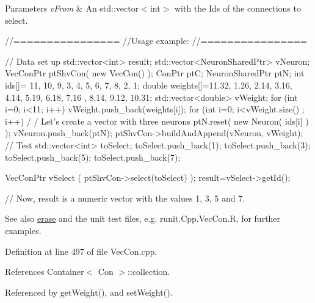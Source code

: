 \begin{DoxyParams}{Parameters}
{\em vFrom} & An std::vector$<$int$>$ with the Ids of the connections to select.\\
\hline
\end{DoxyParams}

\begin{DoxyCode}
        //================
        //Usage example:
        //================

        // Data set up
                std::vector<int> result;
                std::vector<NeuronSharedPtr> vNeuron;
                VecConPtr ptShvCon( new VecCon() );
                ConPtr    ptC;
                NeuronSharedPtr ptN;
                int ids[]= {11, 10, 9, 3, 4, 5, 6, 7, 8, 2, 1};
                double weights[]={11.32, 1.26, 2.14, 3.16, 4.14, 5.19, 6.18, 7.16
      , 8.14, 9.12, 10.31};
                std::vector<double> vWeight;
                for (int i=0; i<11; i++) {
                        vWeight.push_back(weights[i]);
                }
                for (int i=0; i<vWeight.size() ; i++) {                         /
      / Let's create a vector with three neurons
                        ptN.reset( new Neuron( ids[i] ) );
                        vNeuron.push_back(ptN);
                }
                ptShvCon->buildAndAppend(vNeuron, vWeight);
                // Test
                std::vector<int> toSelect;
                toSelect.push_back(1);
                toSelect.push_back(3);
                toSelect.push_back(5);
                toSelect.push_back(7);

                VecConPtr  vSelect (  ptShvCon->select(toSelect)  );
                result=vSelect->getId();

                // Now, result is a numeric vector with the values 1, 3, 5 and 7.
      
\end{DoxyCode}


\begin{DoxySeeAlso}{See also}
\hyperlink{classvec_con_aa9cc2fde90ddf466e820f929ead4fb0b}{erase} and the unit test files, e.g. runit.Cpp.VecCon.R, for further examples. 
\end{DoxySeeAlso}


Definition at line 497 of file VecCon.cpp.



References Container$<$ Con $>$::collection.



Referenced by getWeight(), and setWeight().


